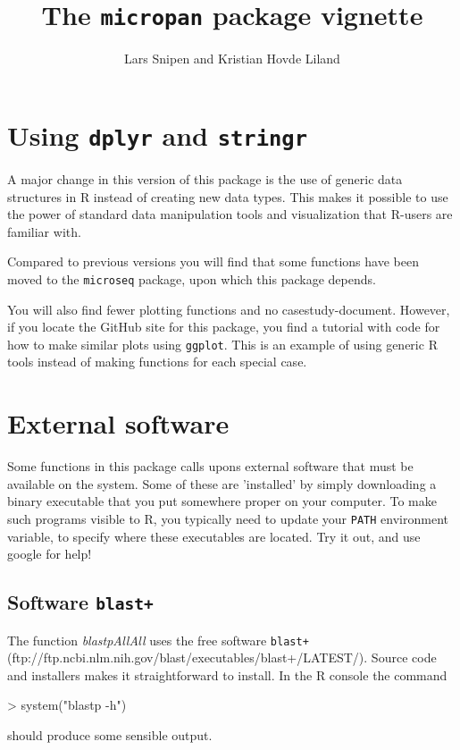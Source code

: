 \documentclass{article}
\title{The \texttt{micropan} package vignette}
\author{Lars Snipen and Kristian Hovde Liland}
\date{}
\begin{document}

\maketitle


\section{Using \texttt{dplyr} and \texttt{stringr}}
A major change in this version of this package is the use of generic data structures in R instead of creating new data types. This makes it possible to use the power of standard data manipulation tools and visualization that R-users are familiar with.

Compared to previous versions you will find that some functions have been moved to the \texttt{microseq} package, upon which this package depends.

You will also find fewer plotting functions and no casestudy-document. However, if you locate the GitHub site for this package, you find a tutorial with code for how to make similar plots using \texttt{ggplot}. This is an example of using generic R tools instead of making functions for each special case.



\section{External software}
Some functions in this package calls upons external software that must be available on the system. Some of these are 'installed' by simply downloading a binary executable that you put somewhere proper on your computer. To make such programs visible to R, you typically need to update your \texttt{PATH} environment variable, to specify where these executables are located. Try it out, and use google for help!


\subsection{Software \texttt{blast+}}
The function \emph{blastpAllAll} uses the free software \texttt{blast+} (ftp://ftp.ncbi.nlm.nih.gov/blast/executables/blast+/LATEST/). Source code and installers makes it straightforward to install. In the R console the command
\begin{Schunk}
\begin{Sinput}
> system("blastp -h")
\end{Sinput}
\end{Schunk}
should produce some sensible output.
\end{document}
